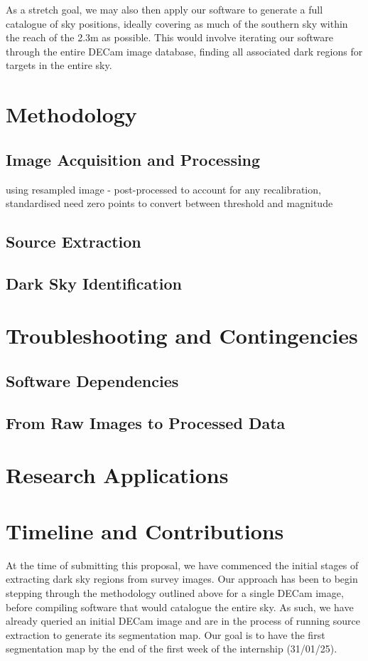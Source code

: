 \documentclass[11pt]{article}
\begin{document}
As a stretch goal, we may also then apply our software to generate a full catalogue of sky positions, ideally covering as much of the southern sky within the reach of the 2.3m as possible. This would involve iterating our software through the entire DECam image database, finding all associated dark regions for targets in the entire sky.

\section{Methodology}
\subsection{Image Acquisition and Processing}
using resampled image - post-processed to account for any recalibration, standardised 
need zero points to convert between threshold and magnitude 
\subsection{Source Extraction}
\subsection{Dark Sky Identification}

\section{Troubleshooting and Contingencies}
\subsection{Software Dependencies}
\subsection{From Raw Images to Processed Data}

\section{Research Applications}

\section{Timeline and Contributions}
At the time of submitting this proposal, we have commenced the initial stages of extracting dark sky regions from survey images. Our approach has been to begin stepping through the methodology outlined above for a single DECam image, before compiling software that would catalogue the entire sky. As such, we have already queried an initial DECam image and are in the process of running source extraction to generate its segmentation map. Our goal is to have the first segmentation map by the end of the first week of the internship (31/01/25). \\
\end{document}
